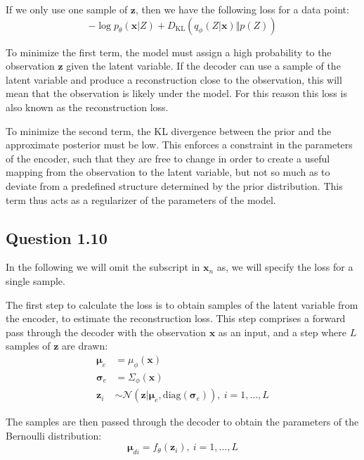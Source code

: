 \documentclass{article}
\begin{document}
If we only use one sample of $\mathbf{z}$, then we have the following loss for a data point: 
\begin{equation*}
-\log p_\theta(\mathbf{x}\vert Z) + D_{\text{KL}}(q_\phi(Z\vert\mathbf{x})\Vert p(Z))
\end{equation*}

To minimize the first term, the model must assign a high probability to the observation $\mathbf{z}$ given the latent variable. If the decoder can use a sample of the latent variable and produce a reconstruction close to the observation, this will mean that the observation is likely under the model. For this reason this loss is also known as the reconstruction loss.

To minimize the second term, the KL divergence between the prior and the approximate posterior must be low. This enforces a constraint in the parameters of the encoder, such that they are free to change in order to create a useful mapping from the observation to the latent variable, but not so much as to deviate from a predefined structure determined by the prior distribution. This term thus acts as a regularizer of the parameters of the model.

\subsection*{Question 1.10}

In the following we will omit the subscript in $\mathbf{x}_n$ as, we will specify the loss for a single sample.

The first step to calculate the loss is to obtain samples of the latent variable from the encoder, to estimate the reconstruction loss. This step comprises a forward pass through the decoder with the observation $\mathbf{x}$ as an input, and a step where $L$ samples of $\mathbf{z}$ are drawn:
\begin{align*}
\boldsymbol{\mu}_e &= \mu_\phi(\mathbf{x}) \\
\boldsymbol{\sigma}_e &= \Sigma_\phi(\mathbf{x}) \\
\mathbf{z}_i &\sim \mathcal{N}(\mathbf{z} \vert \boldsymbol{\mu}_e, \text{diag}(\boldsymbol{\sigma}_e)),\ i = 1, \dots, L
\end{align*}

The samples are then passed through the decoder to obtain the parameters of the Bernoulli distribution:
\begin{equation*}
\boldsymbol{\mu}_{di} = f_\theta(\mathbf{z}_i),\ i = 1, \dots, L
\end{equation*}
\end{document}
